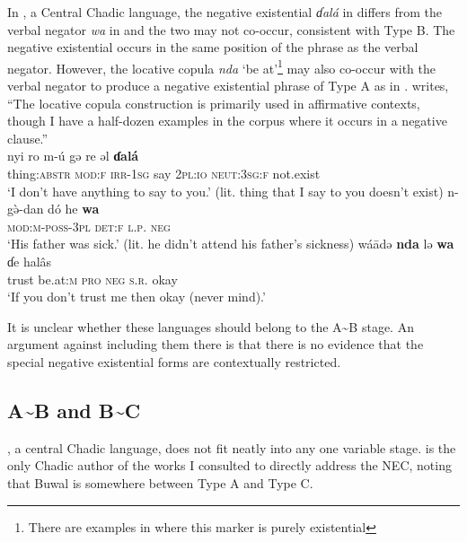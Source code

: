 \documentclass[output=paper]{langsci/langscibook}
\begin{document}
In , a Central Chadic language, the negative existential \textit{ɗal\'a} in  differs from the verbal negator \textit{wa} in  and the two may not co-occur, consistent with Type B. The negative existential occurs in the same position of the phrase as the verbal negator. However, the locative copula \textit{nda} `be at'\footnote{There are examples in \citet{Allison2012} where this marker is purely existential} may also co-occur with the verbal negator to produce a negative existential phrase of Type A as in . \citet[347]{Allison2012} writes, ``The locative copula construction is primarily used in affirmative contexts, though I have a half-dozen examples in the corpus where it occurs in a negative clause.''
\ea\label{ex:makarykotoko-say-sick-trust}
\\
\ea\label{ex:makarykotoko-say}
\gll nyi ro m-\'u gə re əl \textbf{ɗal\'a}\\
thing:\textsc{abstr} \textsc{mod:f} \textsc{irr-1sg} say 2\textsc{pl:io} \textsc{neut:3sg:f} not.exist\\
\glt `I don't have anything to say to you.' (lit. thing that I say to you doesn't exist)
\ex\label{ex:makarykotoko-sick}
\gll n-g\`ə-dan d\'o he \textbf{wa}\\
\textsc{mod:m-poss-3pl} \textsc{det:f} \textsc{l.p.} \textsc{neg}\\
\glt `His father was sick.' (lit. he didn't attend his father's sickness) 
\ex\label{ex:makarykotoko-trust}
\gll w\'a\=adə \textbf{nda} lə \textbf{wa} ɗe halâs\\
trust be.at:\textsc{m} \textsc{pro} \textsc{neg} \textsc{s.r.} okay\\
\glt `If you don't trust me then okay (never mind).'
\z\z

It is unclear whether these languages should belong to the A{\textasciitilde}B stage. An argument against including them there is that there is no evidence that the special negative existential forms are contextually restricted. 

\subsection{A{\textasciitilde}B and B{\textasciitilde}C}\label{sec:3:4.2}

, a central Chadic language, does not fit neatly into any one
variable stage. \citet[293]{Viljoen2013} is the only Chadic author of the
works I consulted to directly address the NEC, noting that Buwal is somewhere between Type A and Type C.  
\end{document}
